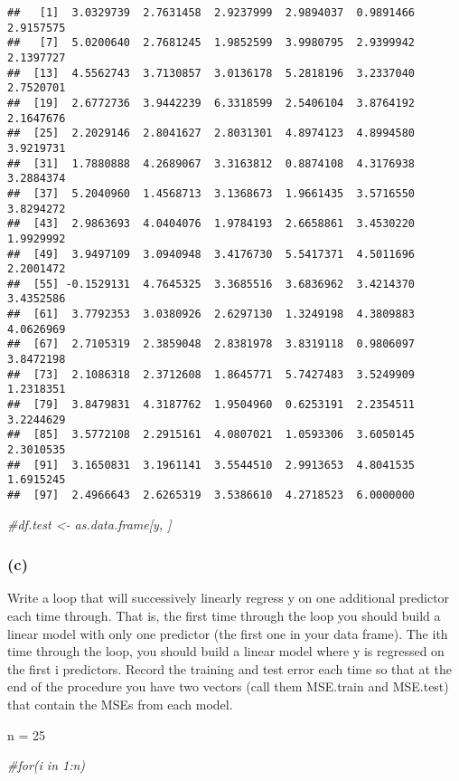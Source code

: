 \documentclass[
]{article}
\newenvironment{Shaded}{\begin{snugshade}}{\end{snugshade}}
\newcommand{\CommentTok}[1]{\textcolor[rgb]{0.56,0.35,0.01}{\textit{#1}}}
\newcommand{\DecValTok}[1]{\textcolor[rgb]{0.00,0.00,0.81}{#1}}
\newcommand{\NormalTok}[1]{#1}
\newcommand{\OtherTok}[1]{\textcolor[rgb]{0.56,0.35,0.01}{#1}}
\begin{document}
\begin{verbatim}
##   [1]  3.0329739  2.7631458  2.9237999  2.9894037  0.9891466  2.9157575
##   [7]  5.0200640  2.7681245  1.9852599  3.9980795  2.9399942  2.1397727
##  [13]  4.5562743  3.7130857  3.0136178  5.2818196  3.2337040  2.7520701
##  [19]  2.6772736  3.9442239  6.3318599  2.5406104  3.8764192  2.1647676
##  [25]  2.2029146  2.8041627  2.8031301  4.8974123  4.8994580  3.9219731
##  [31]  1.7880888  4.2689067  3.3163812  0.8874108  4.3176938  3.2884374
##  [37]  5.2040960  1.4568713  3.1368673  1.9661435  3.5716550  3.8294272
##  [43]  2.9863693  4.0404076  1.9784193  2.6658861  3.4530220  1.9929992
##  [49]  3.9497109  3.0940948  3.4176730  5.5417371  4.5011696  2.2001472
##  [55] -0.1529131  4.7645325  3.3685516  3.6836962  3.4214370  3.4352586
##  [61]  3.7792353  3.0380926  2.6297130  1.3249198  4.3809883  4.0626969
##  [67]  2.7105319  2.3859048  2.8381978  3.8319118  0.9806097  3.8472198
##  [73]  2.1086318  2.3712608  1.8645771  5.7427483  3.5249909  1.2318351
##  [79]  3.8479831  4.3187762  1.9504960  0.6253191  2.2354511  3.2244629
##  [85]  3.5772108  2.2915161  4.0807021  1.0593306  3.6050145  2.3010535
##  [91]  3.1650831  3.1961141  3.5544510  2.9913653  4.8041535  1.6915245
##  [97]  2.4966643  2.6265319  3.5386610  4.2718523  6.0000000
\end{verbatim}

\begin{Shaded}
\begin{Highlighting}[]
\CommentTok{\#df.test \textless{}{-} as.data.frame[y, ]}
\end{Highlighting}
\end{Shaded}

\hypertarget{c-4}{%
\subsubsection{(c)}\label{c-4}}

Write a loop that will successively linearly regress y on one additional
predictor each time through. That is, the first time through the loop
you should build a linear model with only one predictor (the first one
in your data frame). The ith time through the loop, you should build a
linear model where y is regressed on the first i predictors. Record the
training and test error each time so that at the end of the procedure
you have two vectors (call them MSE.train and MSE.test) that contain the
MSEs from each model.

\begin{Shaded}
\begin{Highlighting}[]
\NormalTok{n }\OtherTok{=} \DecValTok{25}

\CommentTok{\#for(i in 1:n)}
\end{Highlighting}
\end{Shaded}
\end{document}
